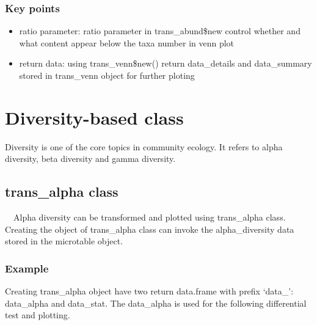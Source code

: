 \documentclass[
]{book}
\newenvironment{Shaded}{\begin{snugshade}}{\end{snugshade}}
\newcommand{\AttributeTok}[1]{\textcolor[rgb]{0.77,0.63,0.00}{#1}}
\newcommand{\CommentTok}[1]{\textcolor[rgb]{0.56,0.35,0.01}{\textit{#1}}}
\newcommand{\DecValTok}[1]{\textcolor[rgb]{0.00,0.00,0.81}{#1}}
\newcommand{\FunctionTok}[1]{\textcolor[rgb]{0.00,0.00,0.00}{#1}}
\newcommand{\NormalTok}[1]{#1}
\newcommand{\OtherTok}[1]{\textcolor[rgb]{0.56,0.35,0.01}{#1}}
\newcommand{\SpecialCharTok}[1]{\textcolor[rgb]{0.00,0.00,0.00}{#1}}
\newcommand{\StringTok}[1]{\textcolor[rgb]{0.31,0.60,0.02}{#1}}
\providecommand{\tightlist}{%
  \setlength{\itemsep}{0pt}\setlength{\parskip}{0pt}}
\begin{document}
\hypertarget{key-points-2}{%
\subsection{Key points}\label{key-points-2}}

\begin{itemize}
\tightlist
\item
  ratio parameter: ratio parameter in trans\_abund\$new control whether and what content appear below the taxa number in venn plot
\item
  return data: using trans\_venn\$new() return data\_details and data\_summary stored in trans\_venn object for further ploting
\end{itemize}

\hypertarget{diversity-based-class}{%
\chapter{Diversity-based class}\label{diversity-based-class}}

Diversity is one of the core topics in community ecology.
It refers to alpha diversity, beta diversity and gamma diversity.

\hypertarget{trans_alpha-class}{%
\section{trans\_alpha class}\label{trans_alpha-class}}

　Alpha diversity can be transformed and plotted using trans\_alpha class.
Creating the object of trans\_alpha class can invoke the alpha\_diversity data stored in the microtable object.

\hypertarget{example-2}{%
\subsection{Example}\label{example-2}}

Creating trans\_alpha object have two return data.frame with prefix `data\_': data\_alpha and data\_stat.
The data\_alpha is used for the following differential test and plotting.

\begin{Shaded}
\end{Shaded}
\end{document}

